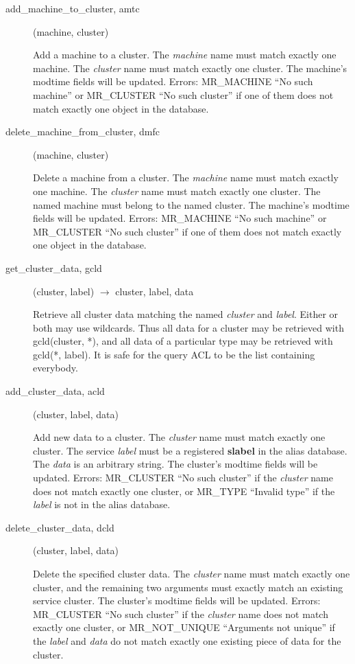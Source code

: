 \documentclass{article}
\begin{document}
\begin{description}
\item[add\_machine\_to\_cluster, amtc](machine, cluster)

Add a machine to a cluster.  The {\em machine} name must match exactly
one machine.  The {\em cluster} name must match exactly one cluster.
The machine's modtime fields will be updated.  Errors: MR\_MACHINE ``No
such machine'' or MR\_CLUSTER ``No such cluster'' if one of them does not
match exactly one object in the database.

\item[delete\_machine\_from\_cluster, dmfc](machine, cluster)

Delete a machine from a cluster.  The {\em machine} name must match
exactly one machine.  The {\em cluster} name must match exactly one
cluster.  The named machine must belong to the named cluster.  The
machine's modtime fields will be updated.  Errors: MR\_MACHINE ``No
such machine'' or MR\_CLUSTER ``No such cluster'' if one of them does not
match exactly one object in the database.

\item[get\_cluster\_data, gcld](cluster, label) $\rightarrow$ cluster, label,
data

Retrieve all cluster data matching the named {\em cluster} and {\em label}.
Either or both may use wildcards.  Thus all data for a cluster may be
retrieved with gcld(cluster, *), and all data of a particular type may
be retrieved with gcld(*, label).  It is safe for the query ACL to be
the list containing everybody.

\item[add\_cluster\_data, acld](cluster, label, data)

Add new data to a cluster.  The {\em cluster} name must match exactly
one cluster.  The service {\em label} must be a registered {\bf slabel} in
the alias database.  The {\em data} is an arbitrary string.  The
cluster's modtime fields will be updated.  Errors: MR\_CLUSTER ``No
such cluster'' if the {\em cluster} name does not match exactly one
cluster, or MR\_TYPE ``Invalid type'' if the {\em label} is not in the
alias database.

\item[delete\_cluster\_data, dcld](cluster, label, data)

Delete the specified cluster data.  The {\em cluster} name must match
exactly one cluster, and the remaining two arguments must exactly
match an existing service cluster.  The cluster's modtime fields will
be updated.  Errors: MR\_CLUSTER ``No such cluster'' if the {\em cluster}
name does not match exactly one cluster, or MR\_NOT\_UNIQUE ``Arguments
not unique'' if the {\em label} and {\em data} do not match exactly one
existing piece of data for the cluster.

\end{description}
\end{document}
